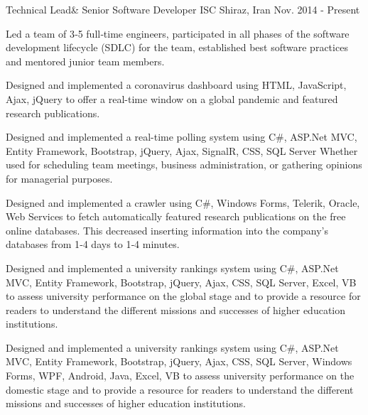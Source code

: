 


\begin{cventries}


\cventry
{Technical Lead\& Senior Software Developer} %
{ISC} %
{Shiraz, Iran} %
{Nov. 2014 - Present} %
{ %
\begin{cvitems}
\item {Led a team of 3‑5 full‑time engineers, participated in all phases of the software development lifecycle (SDLC) for the team, established best software practices and mentored junior team members.}
\item {Designed and implemented a coronavirus dashboard using HTML, JavaScript, Ajax, jQuery to offer a real-time window on a global pandemic and featured research publications.}
\item {Designed and implemented a real-time polling system using C\#, ASP.Net MVC, Entity Framework, Bootstrap, jQuery, Ajax, SignalR, CSS, SQL Server Whether used for scheduling team meetings, business administration, or gathering opinions for managerial purposes.}
\item {Designed and implemented a crawler using C\#, Windows Forms, Telerik, Oracle, Web Services to fetch automatically featured research publications on the free online databases. This decreased inserting information into the company's databases from 1‑4 days to 1‑4 minutes.}
\item {Designed and implemented a university rankings system using C\#, ASP.Net MVC, Entity Framework, Bootstrap, jQuery, Ajax, CSS, SQL Server, Excel, VB to assess university performance on the global stage and to provide a resource for readers to understand the different missions and successes of higher education institutions.}
\item {Designed and implemented a university rankings system using C\#, ASP.Net MVC, Entity Framework, Bootstrap, jQuery, Ajax, CSS, SQL Server, Windows Forms, WPF, Android, Java, Excel, VB to assess university performance on the domestic stage and to provide a resource for readers to understand the different missions and successes of higher education institutions.}

\end{cvitems}}
\end{cventries}

